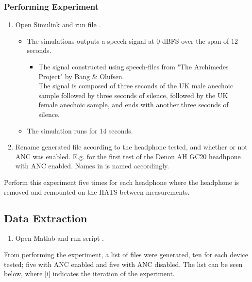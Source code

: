 	\subsubsection{Performing Experiment}
	\begin{enumerate}
		\item Open Simulink and run file .
		\begin{itemize} 
			\item The simulations outputs a speech signal at 0 dBFS over the span of 12 seconds.
			\begin{itemize}
				\item [] The signal constructed using speech-files from "The Archimedes Project" by Bang \& Olufsen. \\
				The signal is composed of three seconds of the UK male anechoic sample followed by three seconds of silence, followed by the UK female anechoic sample, and ends with another three seconds of silence.
			\end{itemize}
			\item The simulation runs for 14 seconds.
		\end{itemize}
		\item Rename generated file  according to the headphone tested, and whether or not ANC was enabled. E.g.  for the first test of the Denon AH GC20 headhpone with ANC enabled. Names in  is named accordingly.

	\end{enumerate}
	Perform this experiment five times for each headphone where the headphone is removed and remounted on the HATS between measurements. 
		
\subsection{Data Extraction}
\begin{enumerate}
	\item Open Matlab and run script .
\end{enumerate}

From performing the experiment, a list of files were generated, ten for each device tested; five with ANC enabled and five with ANC disabled. The list can be seen below, where [i] indicates the iteration of the experiment.

